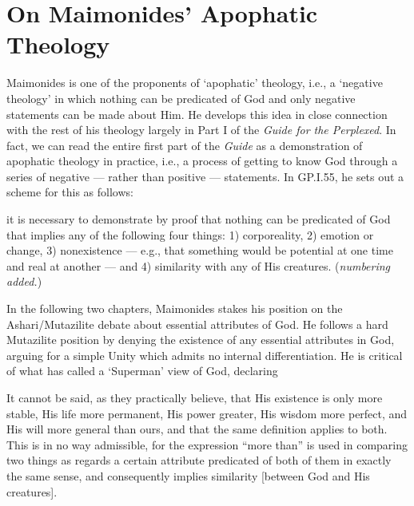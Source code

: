 \documentclass[12pt]{article}
\begin{document}
\section*{On Maimonides' Apophatic Theology}

Maimonides is one of the proponents of `apophatic' theology, i.e., a `negative theology' in which nothing can be predicated of God and only negative statements can be made about Him. He develops this idea in close connection with the rest of his theology largely in Part I of the \textit{Guide for the Perplexed}. In fact, we can read the entire first part of the \textit{Guide} as a demonstration of apophatic theology in practice, i.e., a process of getting to know God through a series of negative --- rather than positive --- statements. In GP.I.55, he sets out a scheme for this as follows:
\begin{displayquote}
	it is necessary to demonstrate by proof that nothing can be predicated of God that implies any of the following four things: 1) corporeality, 2) emotion or change, 3) nonexistence --- e.g., that something would be potential at one time and real at another --- and 4) similarity with any of His creatures. \quad (\textit{numbering added.})
\end{displayquote}

In the following two chapters, Maimonides stakes his position on the Ashari/Mutazilite debate about essential attributes of God. He follows a hard Mutazilite position by denying the existence of any essential attributes in God, arguing for a simple Unity which admits no internal differentiation. He is critical of what \citeauthor{leaman2013moses} has called a `Superman' view of God, declaring
\begin{displayquote}
	It cannot be said, as they practically believe, that His existence is only more stable, His life more permanent, His power greater, His wisdom more perfect, and His will more general than ours, and that the same definition applies to both. This is in no way admissible, for the expression “more than” is used in comparing two things as regards a certain attribute predicated of both of them in exactly the same sense, and consequently implies similarity [between God and His creatures].
\end{displayquote}
\end{document}

